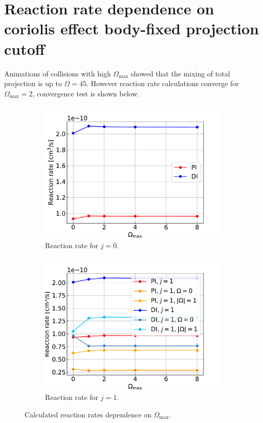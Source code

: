 \documentclass{article}
\begin{document}
\section{Reaction rate dependence on coriolis effect body-fixed projection cutoff}
    Animations of collisions with high $\Omega_\text{max}$ showed that the mixing of 
    total projection is up to $\Omega = 45$. However reaction rate calculations converge 
    for $\Omega_\text{max} = 2$, convergence test is shown below.

    \begin{figure}[H]
        \centering
        \begin{subfigure}{.4\linewidth}
            \centering
            \includegraphics[width=\linewidth]{coriolis_rr_omega_maxes_0.pdf}
            \caption{Reaction rate for $j = 0$.}
        \end{subfigure}
        \begin{subfigure}{.4\linewidth}
            \centering
            \includegraphics[width=\linewidth]{coriolis_rr_omega_maxes_1.pdf}
            \caption{Reaction rate for $j = 1$.}
        \end{subfigure}     
        \caption{Calculated reaction rates dependence on $\Omega_\text{max}$.}
    \end{figure}
\end{document}
